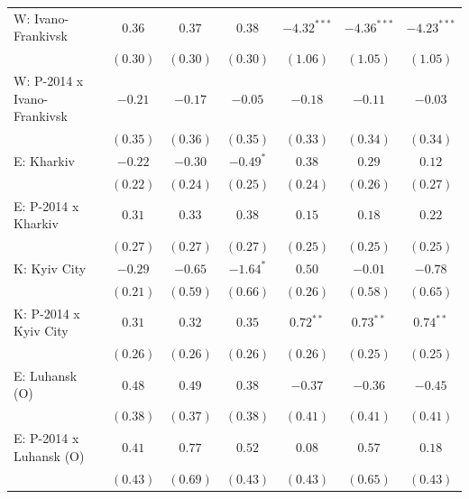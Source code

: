 \begin{table}
\begin{center}
\begin{small}
\begin{tabular}{l c c c c c c}
W: Ivano-Frankivsk          & $0.36$        & $0.37$       & $0.38$        & $-4.32^{***}$  & $-4.36^{***}$  & $-4.23^{***}$  \\
                            & $(0.30)$      & $(0.30)$     & $(0.30)$      & $(1.06)$       & $(1.05)$       & $(1.05)$       \\
W: P-2014 x Ivano-Frankivsk & $-0.21$       & $-0.17$      & $-0.05$       & $-0.18$        & $-0.11$        & $-0.03$        \\
                            & $(0.35)$      & $(0.36)$     & $(0.35)$      & $(0.33)$       & $(0.34)$       & $(0.34)$       \\
E: Kharkiv                  & $-0.22$       & $-0.30$      & $-0.49^{*}$   & $0.38$         & $0.29$         & $0.12$         \\
                            & $(0.22)$      & $(0.24)$     & $(0.25)$      & $(0.24)$       & $(0.26)$       & $(0.27)$       \\
E: P-2014 x Kharkiv         & $0.31$        & $0.33$       & $0.38$        & $0.15$         & $0.18$         & $0.22$         \\
                            & $(0.27)$      & $(0.27)$     & $(0.27)$      & $(0.25)$       & $(0.25)$       & $(0.25)$       \\
K: Kyiv City                & $-0.29$       & $-0.65$      & $-1.64^{*}$   & $0.50$         & $-0.01$        & $-0.78$        \\
                            & $(0.21)$      & $(0.59)$     & $(0.66)$      & $(0.26)$       & $(0.58)$       & $(0.65)$       \\
K: P-2014 x Kyiv City       & $0.31$        & $0.32$       & $0.35$        & $0.72^{**}$    & $0.73^{**}$    & $0.74^{**}$    \\
                            & $(0.26)$      & $(0.26)$     & $(0.26)$      & $(0.26)$       & $(0.25)$       & $(0.25)$       \\
E: Luhansk (O)              & $0.48$        & $0.49$       & $0.38$        & $-0.37$        & $-0.36$        & $-0.45$        \\
                            & $(0.38)$      & $(0.37)$     & $(0.38)$      & $(0.41)$       & $(0.41)$       & $(0.41)$       \\
E: P-2014 x Luhansk (O)     & $0.41$        & $0.77$       & $0.52$        & $0.08$         & $0.57$         & $0.18$         \\
                            & $(0.43)$      & $(0.69)$     & $(0.43)$      & $(0.43)$       & $(0.65)$       & $(0.43)$       \\

\end{tabular}
\end{small}
\end{center}
\end{table}
